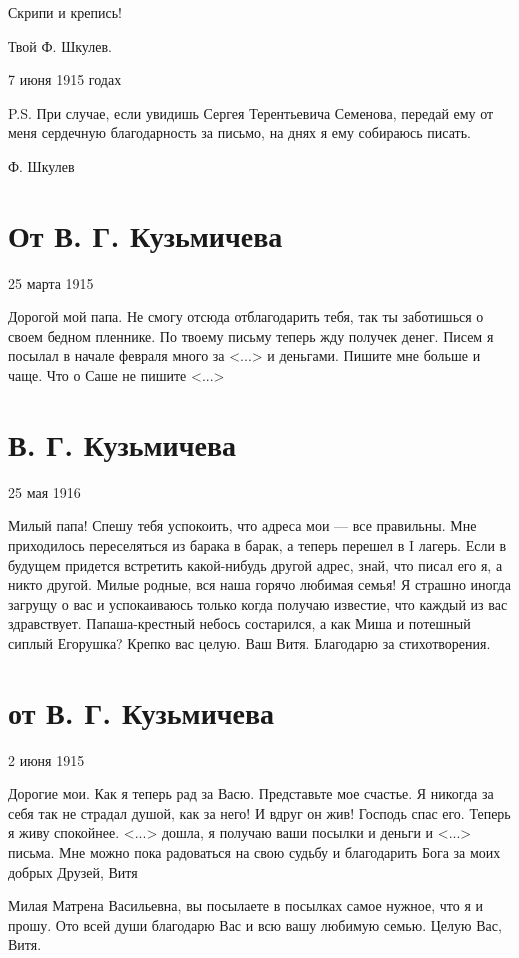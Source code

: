 \documentclass[]{memoir}
\begin{document}
Скрипи и крепись!

Твой Ф. Шкулев.

7 июня 1915 годах

P.S. При случае, если увидишь Сергея Терентьевича Семенова, передай ему от меня сердечную благодарность за письмо, на днях я ему собираюсь писать.

Ф. Шкулев

\section{От В. Г. Кузьмичева}

25 марта 1915

Дорогой мой папа. Не смогу отсюда отблагодарить тебя, так ты заботишься о своем бедном пленнике. По твоему письму теперь жду получек денег. Писем я посылал в начале февраля много за <...> и деньгами. Пишите мне больше и чаще. Что о Саше не пишите <...>

\section{В. Г. Кузьмичева}

25 мая 1916

Милый папа! Спешу тебя успокоить, что адреса мои — все правильны. Мне приходилось переселяться из барака в барак, а теперь перешел в I лагерь. Если в будущем придется встретить какой-нибудь другой адрес, знай, что писал его я, а никто другой. Милые родные, вся наша горячо любимая семья! Я страшно иногда загрущу о вас и успокаиваюсь только когда получаю известие, что каждый из вас здравствует. Папаша-крестный небось состарился, а как Миша и потешный сиплый Егорушка? Крепко вас целую. Ваш Витя. Благодарю за стихотворения.

\section{от В. Г. Кузьмичева}
2 июня 1915

Дорогие мои. Как я теперь рад за Васю. Представьте мое счастье. Я никогда за себя так не страдал душой, как за него! И вдруг он жив! Господь спас его. Теперь я живу спокойнее. <...> дошла, я получаю ваши посылки и деньги и <...> письма. Мне можно пока радоваться на свою судьбу и благодарить Бога за моих добрых Друзей, Витя

Милая Матрена Васильевна, вы посылаете в посылках самое нужное, что я и прошу. Ото всей души благодарю Вас и всю вашу любимую семью. Целую Вас, Витя.
\end{document}
